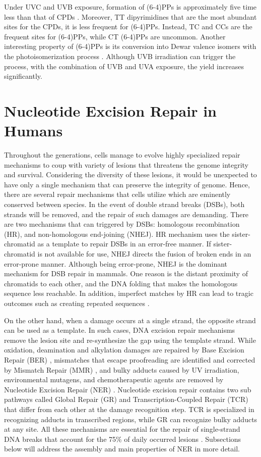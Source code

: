Under UVC and UVB exposure, formation of (6-4)PPs is approximately five time less than that of CPDs \citep{douki2001individual}. Moreover, TT dipyrimidines that are the most abundant sites for the CPDs, it is less frequent for (6-4)PPs. Instead, TC and CCs are the frequent sites for (6-4)PPs, while CT (6-4)PPs are uncommon. Another interesting property of (6-4)PPs is its conversion into Dewar valence isomers with the photoisomerization process \citep{taylor1987dna}. Although UVB irradiation can trigger the process, with the combination of UVB and UVA exposure, the yield increases significantly.

\section{Nucleotide Excision Repair in Humans}

Throughout the generations, cells manage to evolve highly specialized repair mechanisms to coup with variety of lesions that threatens the genome integrity and survival. Considering the diversity of these lesions, it would be unexpected to have only a single mechanism that can preserve the integrity of genome. Hence, there are several repair mechanisms that cells utilize which are eminently conserved between species. In the event of double strand breaks (DSBs), both strands will be removed, and the repair of such damages are demanding. There are two mechanisms that can triggered by DSBs: homologous recombination (HR), and non-homologous end-joining (NHEJ). HR mechanism uses the sister-chromatid as a template to repair DSBs in an error-free manner. If sister-chromatid is not available for use, NHEJ directs the fusion of broken ends in an error-prone manner. Although being error-prone, NHEJ is the dominant mechanism for DSB repair in mammals. One reason is the distant proximity of chromatids to each other, and the DNA folding that makes the homologous sequence less reachable. In addition, imperfect matches by HR can lead to tragic outcomes such as creating repeated sequences \citep{li2018mismatch}.

On the other hand, when a damage occurs at a single strand, the opposite strand can be used as a template. In such cases, DNA excision repair mechanisms remove the lesion site and re-synthesize the gap using the template strand. While oxidation, deamination and alkylation damages are repaired by Base Excision Repair (BER) \citep{klungland1999base}, mismatches that escape proofreading are identified and corrected by Mismatch Repair (MMR) \citep{modrich1997strand}, and bulky adducts caused by UV irradiation, environmental mutagens, and chemotherapeutic agents are removed by Nucleotide Excision Repair (NER) \citep{reardon2005nucleotide}. Nucleotide excision repair contains two sub pathways called Global Repair (GR) and Transcription-Coupled Repair (TCR) that differ from each other at the damage recognition step. TCR is specialized in recognizing adducts in transcribed regions, while GR can recognize bulky adducts at any site. All these mechanisms are essential for the repair of single-strand DNA breaks that account for the 75\% of daily occurred lesions \citep{tubbs2017endogenous}. Subsections below will address the assembly and main properties of NER in more detail.  

